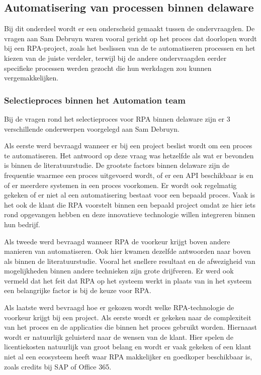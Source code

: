 \subsection{Automatisering van processen binnen delaware}
\label{subsec:automatisering-van-processen-binnen-delaware}

Bij dit onderdeel wordt er een onderscheid gemaakt tussen de ondervraagden. De vragen aan Sam Debruyn waren vooral gericht op het proces dat doorlopen wordt bij een RPA-project, zoals het beslissen van de te automatiseren processen en het kiezen van de juiste verdeler, terwijl bij de andere ondervraagden eerder specifieke processen werden gezocht die hun werkdagen zou kunnen vergemakkelijken.

\subsubsection{Selectieproces binnen het Automation team}
\label{subsubsec:selectieproces-binnen-het-automation-team}

Bij de vragen rond het selectieproces voor RPA binnen delaware zijn er 3 verschillende onderwerpen voorgelegd aan Sam Debruyn.

Als eerste werd bevraagd wanneer er bij een project beslist wordt om een proces te automatiseren. Het antwoord op deze vraag was hetzelfde als wat er bevonden is binnen de literatuurstudie. De grootste factors binnen delaware zijn de frequentie waarmee een proces uitgevoerd wordt, of er een API beschikbaar is en of er meerdere systemen in een proces voorkomen. Er wordt ook regelmatig gekeken of er niet al een automatisering bestaat voor een bepaald proces. Vaak is het ook de klant die RPA voorstelt binnen een bepaald project omdat ze hier iets rond opgevangen hebben en deze innovatieve technologie willen integreren binnen hun bedrijf.

Als tweede werd bevraagd wanneer RPA de voorkeur krijgt boven andere manieren van automatiseren. Ook hier kwamen dezelfde antwoorden naar boven als binnen de literatuurstudie. Vooral het snellere resultaat en de afwezigheid van mogelijkheden binnen andere technieken zijn grote drijfveren. Er werd ook vermeld dat het feit dat RPA op het systeem werkt in plaats van in het systeem een belangrijke factor is bij de keuze voor RPA.

Als laatste werd bevraagd hoe er gekozen wordt welke RPA-technologie de voorkeur krijgt bij een project. Als eerste wordt er gekeken naar de complexiteit van het proces en de applicaties die binnen het proces gebruikt worden. Hiernaast wordt er natuurlijk geluisterd naar de wensen van de klant. Hier spelen de licentiekosten natuurlijk van groot belang en wordt er vaak gekeken of een klant niet al een ecosysteem heeft waar RPA makkelijker en goedkoper beschikbaar is, zoals credits bij SAP of Office 365. 

